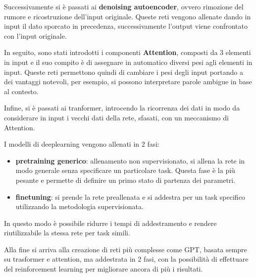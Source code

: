 Successivamente si è passati ai \textbf{denoising autoencoder}, ovvero rimozione
del rumore e ricostruzione dell'input originale. Queste reti vengono allenate dando
in input il dato sporcato in precedenza, successivamente l'output viene confrontato
con l'input originale.

In seguito, sono stati introdotti i componenti \textbf{Attention}, composti da 3
elementi in input e il suo compito è di assegnare in automatico diversi pesi
agli elementi in input. Queste reti permettono quindi di cambiare i pesi degli input
portando a dei vantaggi notevoli, per esempio, si possono interpretare parole ambigue
in base al contesto.

Infine, si è passati ai tranformer, introcendo la ricorrenza dei dati in modo da
considerare in input i vecchi dati della rete, sfasati, con un meccanismo di
Attention.

I modelli di deeplearning vengono allenati in 2 fasi:
\begin{itemize}
      \item \textbf{pretraining generico}: allenamento non supervisionato, si allena
            la rete in modo generale senza specificare un particolare task. Questa
            fase è la più pesante e permette di definire un primo stato di partenza
            dei parametri.
      \item \textbf{finetuning}: si prende la rete preallenata e si addestra per un
            task specifico utilizzando la metodologia supervisionata.
\end{itemize}
In questo modo è possibile ridurre i tempi di addestramento e rendere riutilizzabile
la stessa rete per task simili.

Alla fine si arriva alla creazione di reti più complesse come GPT, basata sempre
su trasformer e attention, ma addestrata in 2 fasi, con la possibilità di effettuare
del reinforcement learning per migliorare ancora di più i risultati.